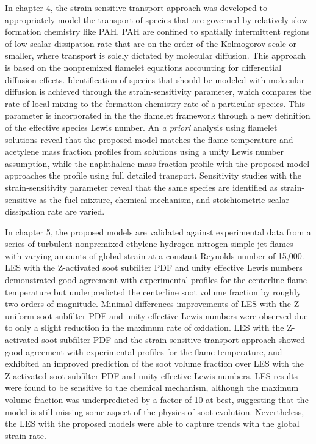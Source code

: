 In chapter 4, the strain-sensitive transport approach was developed to appropriately model the transport of species that are governed by relatively slow formation chemistry like PAH. PAH are confined to spatially intermittent regions of low scalar dissipation rate that are on the order of the Kolmogorov scale or smaller, where transport is solely dictated by molecular diffusion. This approach is based on the nonpremixed flamelet equations accounting for differential diffusion effects. Identification of species that should be modeled with molecular diffusion is achieved through the strain-sensitivity parameter, which compares the rate of local mixing to the formation chemistry rate of a particular species. This parameter is incorporated in the the flamelet framework through a new definition of the effective species Lewis number. An \textit{a priori} analysis using flamelet solutions reveal that the proposed model matches the flame temperature and acetylene mass fraction profiles from solutions using a unity Lewis number assumption, while the naphthalene mass fraction profile with the proposed model approaches the profile using full detailed transport. Sensitivity studies with the strain-sensitivity parameter reveal that the same species are identified as strain-sensitive as the fuel mixture, chemical mechanism, and stoichiometric scalar dissipation rate are varied.

In chapter 5, the proposed models are validated against experimental data from a series of turbulent nonpremixed ethylene-hydrogen-nitrogen simple jet flames with varying amounts of global strain at a constant Reynolds number of 15,000. LES with the Z-activated soot subfilter PDF and unity effective Lewis numbers demonstrated good agreement with experimental profiles for the centerline flame temperature but underpredicted the centerline soot volume fraction by roughly two orders of magnitude. Minimal differences improvements of LES with the Z-uniform soot subfilter PDF and unity effective Lewis numbers were observed due to only a slight reduction in the maximum rate of oxidation. LES with the Z-activated soot subfilter PDF and the strain-sensitive transport approach showed good agreement with experimental profiles for the flame temperature, and exhibited an improved prediction of the soot volume fraction over LES with the Z-activated soot subfilter PDF and unity effective Lewis numbers. LES results were found to be sensitive to the chemical mechanism, although the maximum volume fraction was underpredicted by a factor of 10 at best, suggesting that the model is still missing some aspect of the physics of soot evolution. Nevertheless, the LES with the proposed models were able to capture trends with the global strain rate.

